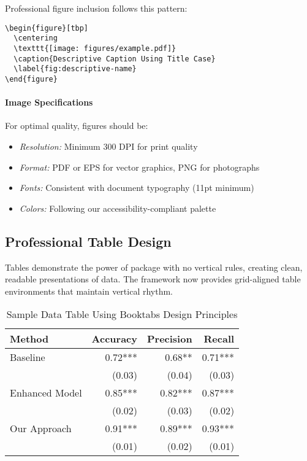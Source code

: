 \documentclass[11pt]{article}
\begin{document}
Professional figure inclusion follows this pattern:

\begin{verbatim}
\begin{figure}[tbp]
  \centering
  \texttt{[image: figures/example.pdf]}
  \caption{Descriptive Caption Using Title Case}
  \label{fig:descriptive-name}
\end{figure}
\end{verbatim}

\paragraph{Image Specifications} For optimal quality, figures should be:
\begin{itemize}
\item \emph{Resolution:} Minimum 300 DPI for print quality
\item \emph{Format:} PDF or EPS for vector graphics, PNG for photographs
\item \emph{Fonts:} Consistent with document typography (11pt minimum)
\item \emph{Colors:} Following our accessibility-compliant palette
\end{itemize}

\subsection{Professional Table Design}

Tables demonstrate the power of  package with no vertical rules, creating clean, readable presentations of data. The framework now provides grid-aligned table environments that maintain vertical rhythm.

\begin{table}[tbp]
  \caption{Sample Data Table Using Booktabs Design Principles}
  \label{tab:sample-data}
  \centering
  \begin{tabular}{@{}lrrr@{}}
    \toprule
    Method & Accuracy & Precision & Recall \\
    \midrule
    Baseline & 0.72*** & 0.68** & 0.71*** \\
                & (0.03) & (0.04) & (0.03) \\
    Enhanced Model & 0.85*** & 0.82*** & 0.87*** \\
                   & (0.02) & (0.03) & (0.02) \\
    Our Approach & 0.91*** & 0.89*** & 0.93*** \\
                 & (0.01) & (0.02) & (0.01) \\
    \bottomrule
  \end{tabular}
  \begin{tablenotes}
    \tabstars
  \end{tablenotes}
\end{table}
\end{document}
